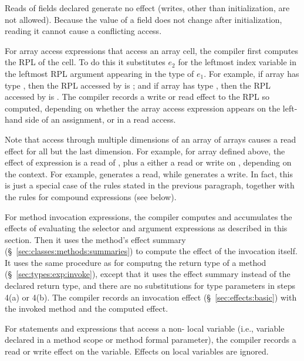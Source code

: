 Reads of fields declared  generate no effect (writes, other
than initialization, are not allowed).  Because the value of
a  field does not change after initialization, reading it
cannot cause a conflicting access.

 For array access expressions 
that access an array cell, the compiler first computes the RPL of the
cell.  To do this it substitutes $e_2$ for the leftmost index variable
in the leftmost RPL argument appearing in the type of $e_1$.  For
example, if array  has type , then the RPL
accessed by  is \kwd{[i]}; and if array  has type
, then the RPL accessed by 
is \kwd{[0]}.  The compiler records a write or read effect to the RPL
so computed, depending on whether the array access expression appears
on the left-hand side of an assignment, or in a read access.

Note that access through multiple dimensions of an array of arrays
causes a read effect for all but the last dimension.  For example, for
array  defined above, the effect of expression  is
a read of \kwd{[0]}, plus a either a read or write on \kwd{[0]:[1]},
depending on the context.  For example,  generates a
read, while  generates a write.  In fact, this is
just a special case of the rules stated in the previous paragraph,
together with the rules for compound expressions (see below).

 For method invocation expressions, the
compiler computes and accumulates the effects of evaluating the
selector and argument expressions as described in this section.  Then
it uses the method's effect summary
(\S~\ref{sec:classes:methods:summaries}) to compute the effect of the
invocation itself.  It uses the same procedure as for computng the
return type of a method (\S~\ref{sec:types:exp:invoke}), except that
it uses the effect summary instead of the declared return type, and
there are no substitutions for type parameters in steps 4(a) or 4(b).
The compiler records an invocation effect (\S~\ref{sec:effects:basic})
with the invoked method and the computed effect.

  For statements and expressions that
access a non- local variable (i.e., variable declared in a
method scope or method formal parameter), the compiler records a read
or write effect on the variable.  Effects on  local
variables are ignored.

